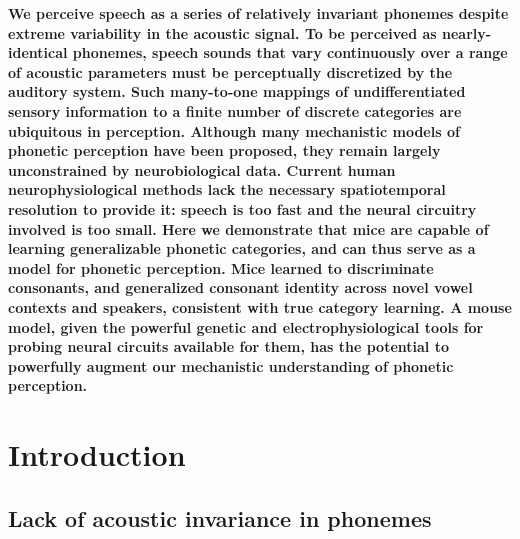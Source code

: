

\bfseries\noindent We perceive speech as a series of relatively invariant phonemes despite extreme variability in the acoustic signal. To be perceived as nearly-identical phonemes, speech sounds that vary continuously over a range of acoustic parameters must be perceptually discretized by the auditory system. Such many-to-one mappings of undifferentiated sensory information to a finite number of discrete categories are ubiquitous in perception. Although many mechanistic models of phonetic perception have been proposed, they remain largely unconstrained by neurobiological data. Current human neurophysiological methods lack the necessary spatiotemporal resolution to provide it: speech is too fast and the neural circuitry involved is too small. Here we demonstrate that mice are capable of learning generalizable phonetic categories, and can thus serve as a model for phonetic perception. Mice learned to discriminate consonants, and generalized consonant identity across novel vowel contexts and speakers, consistent with true category learning. A mouse model, given the powerful genetic and electrophysiological tools for probing neural circuits available for them, has the potential to powerfully augment our mechanistic understanding of phonetic perception.\normalfont

%
%
%
\section{Introduction}
\subsection{Lack of acoustic invariance in phonemes}

